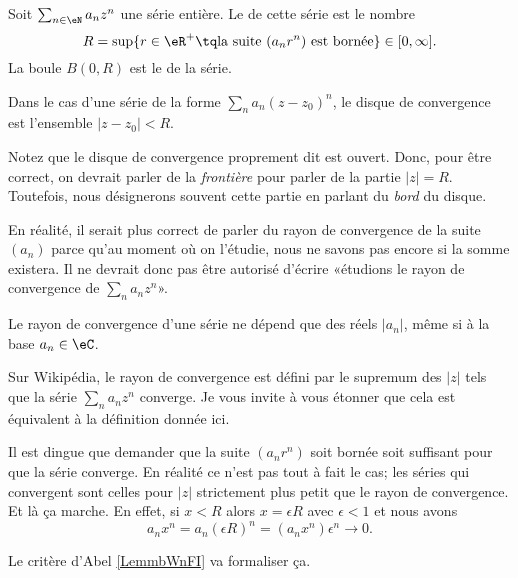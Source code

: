 \begin{definition}  \label{DefZWKOZOl}
	Soit \( \sum_{n\in \eN}a_nz^n\) une série entière. Le  de cette série est le nombre
	\begin{equation}
		R=\sup\{ r\in \eR^+\tq \text{la suite }(a_nr^n)\text{ est bornée} \}\in\mathopen[ 0 , \infty \mathclose].
	\end{equation}
	La boule \( B(0,R)\) est le  de la série.

	Dans le cas d'une série de la forme  \( \sum_n a_n(z-z_0)^n\), le disque de convergence est l'ensemble \( | z-z_0 |< R\).
\end{definition}

\begin{normaltext}
	Notez que le disque de convergence proprement dit est ouvert. Donc, pour être correct, on devrait parler de la \emph{frontière} pour parler de la partie \( | z |=R\). Toutefois, nous désignerons souvent cette partie en parlant du \emph{bord} du disque.
\end{normaltext}

\begin{normaltext}
	En réalité, il serait plus correct de parler du rayon de convergence de la suite \( (a_n)\) parce qu'au moment où on l'étudie, nous ne savons pas encore si la somme existera. Il ne devrait donc pas être autorisé d'écrire «étudions le rayon de convergence de \( \sum_na_nz^n\)».

	Le rayon de convergence d'une série ne dépend que des réels \( | a_n |\), même si à la base \( a_n\in \eC\).
\end{normaltext}

\begin{normaltext}
	Sur Wikipédia\cite{BIBooRVNCooAKQeld}, le rayon de convergence est défini par le supremum des \( | z |\) tels que la série \( \sum_na_nz^n\) converge. Je vous invite à vous étonner que cela est équivalent à la définition donnée ici.

	Il est dingue que demander que la suite \( (a_nr^n)\) soit bornée soit suffisant pour que la série converge. En réalité ce n'est pas tout à fait le cas; les séries qui convergent sont celles pour \( | z |\) strictement plus petit que le rayon de convergence. Et là ça marche. En effet, si \( x<R\) alors \( x=\epsilon R\) avec \( \epsilon<1\) et nous avons
	\begin{equation}
		a_nx^n=a_n(\epsilon R)^n=(a_nx^n)\epsilon^n\to 0.
	\end{equation}

	Le critère d'Abel \ref{LemmbWnFI} va formaliser ça.
\end{normaltext}

